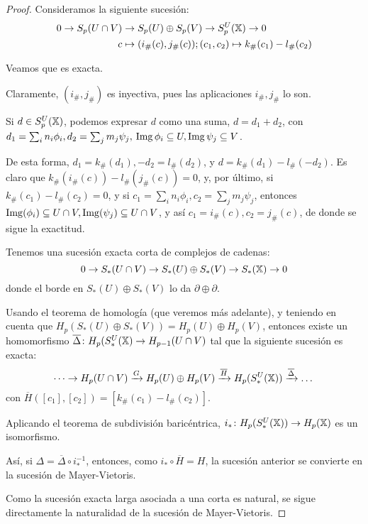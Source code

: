 \begin{proof}
  Consideramos la siguiente sucesión:
  \begin{align*}
    0 \to S_p(U \cap V) &\to S_p(U) \oplus S_p(V) \to S_p^U({\mathbb X}) \to 0 \\
                    c &\mapsto (i_\#(c), j_\#(c)); (c_1, c_2) \mapsto k_\#(c_1) - l_\#(c_2)
  \end{align*}

  Veamos que es exacta.

  Claramente, $(i_\#, j_\#)$ es inyectiva, pues las aplicaciones $i_\#, j_\#$ lo son.

  Si $d \in S_p^U({\mathbb X})$, podemos expresar $d$ como una suma, $d = d_1 + d_2$, con
  $d_1 = \sum_i n_i \phi_i, d_2 = \sum_j m_j \psi_j, \hspace{0.2em}  \operatorname{Img} \phi_i \subseteq U, \operatorname{Img} \psi_j \subseteq V$.

  De esta forma, $d_1 = k_\#(d_1), -d_2 = l_\#(d_2)$, y $d = k_\#(d_1) - l_\#(-d_2)$.
  Es claro que $k_\#(i_\#(c)) - l_\#(j_\#(c)) = 0$, y, por último, si $k_\#(c_1) - l_\#(c_2) = 0$, y si
  $c_1 = \sum_i n_i \phi_i,  c_2 = \sum_j m_j \psi_j$, entonces $\operatorname{Img}(\phi_i) \subseteq U \cap V, \operatorname{Img}(\psi_j) \subseteq U \cap V$,
  y así $c_1 = i_\#(c), c_2 = j_\#(c)$, de donde se sigue la exactitud.

  Tenemos una sucesión exacta corta de complejos de cadenas:
  \[ 0 \to S_*(U \cap V) \to S_*(U) \oplus S_*(V) \to S_*({\mathbb X}) \to 0 \]
  donde el borde en $S_*(U) \oplus S_*(V)$ lo da $\partial \oplus \partial$.

  Usando el teorema de homología (que veremos más adelante), y teniendo en cuenta que $H_p(S_*(U) \oplus S_*(V)) = H_p(U) \oplus H_p(V)$,
  entonces existe un homomorfismo $\overline{\Delta} \colon H_p(S_*^U({\mathbb X}) \to H_{p-1}(U \cap V)$ tal que la siguiente sucesión es exacta:
  \[ \dots \to H_p(U \cap V) \xrightarrow{G} H_p(U) \oplus H_p(V) \xrightarrow{\overline{H}} H_p(S_*^U({\mathbb X})) \xrightarrow{\overline{\Delta}} \dots \]
  con $\overline{H}([c_1], [c_2]) = [k_\#(c_1) - l_\#(c_2)]$.

  Aplicando el teorema de subdivisión baricéntrica, $i_* \colon H_p(S_*^U({\mathbb X})) \to H_p({\mathbb X})$ es un isomorfismo.

  Así, si $\Delta = \overline{\Delta} \circ i_*^{-1}$, entonces, como $i_* \circ \overline{H} = H$, la sucesión anterior se convierte
  en la sucesión de Mayer-Vietoris.

  Como la sucesión exacta larga asociada a una corta es natural, se sigue directamente la naturalidad de la sucesión de Mayer-Vietoris.
\end{proof}

